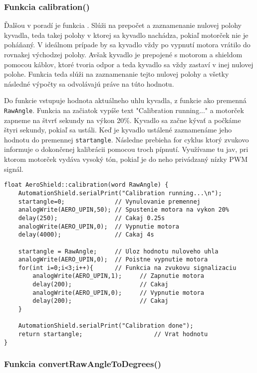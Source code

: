 \subsubsection{Funkcia calibration()}

Ďalšou v poradí je funkcia . Slúži na prepočet a zaznamenanie nulovej polohy kyvadla, teda takej polohy v ktorej sa kyvadlo nachádza, pokiaľ motorček nie je poháňaný. V ideálnom prípade by sa kyvadlo vždy po vypnutí motora vrátilo do rovnakej východzej polohy. Avšak kyvadlo je prepojené s motorom a shieldom pomocou káblov, ktoré tvoria odpor a teda kyvadlo sa vždy zastaví v inej nulovej polohe. Funkcia  teda slúži na zaznamenanie tejto nulovej polohy a všetky následné výpočty sa odvolávajú práve na túto hodnotu. 

Do funkcie vstupuje hodnota aktuálneho uhlu kyvadla, z funkcie  ako premenná \verb|RawAngle|. Funkcia na začiatok vypíše text "Calibration running..." a motorček zapneme na štvrť sekundy na výkon 20\%. Kyvadlo sa začne kývať a počkáme štyri sekundy, pokiaľ sa ustáli. Keď je kyvadlo ustálené zaznamenáme jeho hodnotu do premennej \verb|startangle|. Následne prebieha for cyklus ktorý zvukovo informuje o dokončenej kalibrácii pomocou troch pípnutí. Využívame tu jav, pri ktorom motorček vydáva vysoký tón, pokiaľ je do neho privádzaný nízky PWM signál. 

\begin{lstlisting}[caption={Zdrojový kód funkcie calibration.},captionpos=b]
float AeroShield::calibration(word RawAngle) {  
	AutomationShield.serialPrint("Calibration running...\n");  
	startangle=0;              // Vynulovanie premennej 
	analogWrite(AERO_UPIN,50); // Spustenie motora na vykon 20%
	delay(250);                // Cakaj 0.25s 
	analogWrite(AERO_UPIN,0);  // Vypnutie motora
	delay(4000);               // Cakaj 4s
	
	startangle = RawAngle;     // Uloz hodnotu nuloveho uhla
	analogWrite(AERO_UPIN,0);  // Poistne vypnutie motora 
	for(int i=0;i<3;i++){      // Funkcia na zvukovu signalizaciu
		analogWrite(AERO_UPIN,1);     // Zapnutie motora
		delay(200);                   // Cakaj
		analogWrite(AERO_UPIN,0);     // Vypnutie motora
		delay(200);                   // Cakaj
	}
	
	AutomationShield.serialPrint("Calibration done");
	return startangle;                    // Vrat hodnotu 
}
\end{lstlisting}

\subsubsection{Funkcia convertRawAngleToDegrees()}

